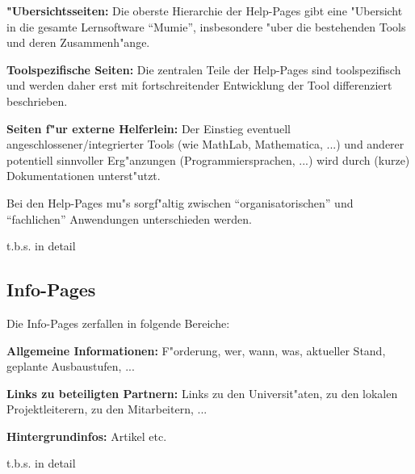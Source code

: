 \begin{list_sabina}
\item
\textbf{"Ubersichtsseiten:}
Die oberste Hierarchie der Help-Pages gibt eine "Ubersicht in die
gesamte Lernsoftware ``Mumie'', insbesondere "uber
die bestehenden Tools und deren Zusammenh"ange.
\item
\textbf{Toolspezifische Seiten:}
Die zentralen Teile der Help-Pages sind toolspezifisch und werden daher erst
mit fortschreitender Entwicklung der Tool differenziert beschrieben.
\item
\textbf{Seiten f"ur externe Helferlein:}
Der Einstieg eventuell angeschlossener/integrierter Tools (wie MathLab,
Mathematica, ...) und anderer potentiell sinnvoller Erg"anzungen
(Programmiersprachen, ...) wird durch (kurze) Dokumentationen unterst"utzt.
\end{list_sabina}

Bei den Help-Pages mu"s sorgf"altig zwischen ``organisatorischen'' und
``fachlichen'' Anwendungen unterschieden werden.

\vspace{10mm}

t.b.s. in detail


\clearpage


\subsection{Info-Pages}\label{kap:info_pages}

Die Info-Pages zerfallen in folgende Bereiche:

\begin{list_sabina}
\item
\textbf{Allgemeine Informationen:}
F"orderung, wer, wann, was, aktueller Stand, geplante Ausbaustufen, ...
\item
\textbf{Links zu beteiligten Partnern:}
Links zu den Universit"aten, zu den lokalen Projektleiterern, 
zu den Mitarbeitern, ...
\item
\textbf{Hintergrundinfos:}
Artikel etc.
\end{list_sabina}

\vspace{10mm}

t.b.s. in detail


